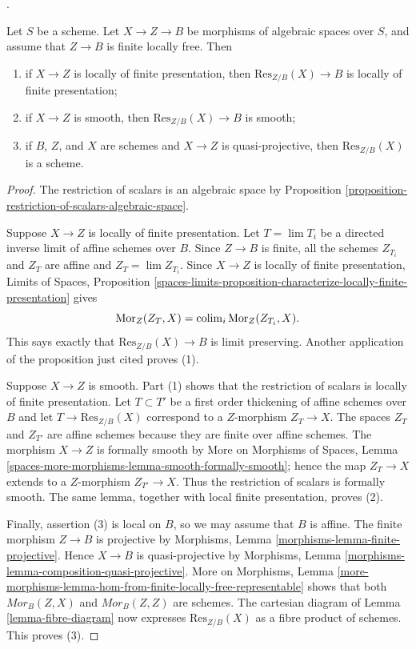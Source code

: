 \begin{proposition}
\label{proposition-restriction-of-scalars-properties}
\begin{reference}
\cite[Expos\'e 221, Proposition 5.7]{FGA}.
\end{reference}
Let $S$ be a scheme. Let $X \to Z \to B$ be morphisms of algebraic spaces
over $S$, and assume that $Z \to B$ is finite locally free. Then
\begin{enumerate}
\item if $X \to Z$ is locally of finite presentation, then
$\text{Res}_{Z/B}(X) \to B$ is locally of finite presentation;
\item if $X \to Z$ is smooth, then
$\text{Res}_{Z/B}(X) \to B$ is smooth;
\item if $B$, $Z$, and $X$ are schemes and $X \to Z$ is quasi-projective,
then $\text{Res}_{Z/B}(X)$ is a scheme.
\end{enumerate}
\end{proposition}

\begin{proof}
The restriction of scalars is an algebraic space by Proposition
\ref{proposition-restriction-of-scalars-algebraic-space}.

Suppose $X \to Z$ is locally of finite presentation. Let
$T = \lim T_i$ be a directed inverse limit of affine schemes over $B$.
Since $Z \to B$ is finite, all the schemes $Z_{T_i}$ and $Z_T$ are affine
and $Z_T = \lim Z_{T_i}$. Since $X \to Z$ is locally of finite
presentation, Limits of Spaces, Proposition
\ref{spaces-limits-proposition-characterize-locally-finite-presentation}
gives
$$
\mathop{\mathrm{Mor}}\nolimits_Z(Z_T, X) = \mathop{\mathrm{colim}}\nolimits_i \mathop{\mathrm{Mor}}\nolimits_Z(Z_{T_i}, X).
$$
This says exactly that $\text{Res}_{Z/B}(X) \to B$ is limit preserving.
Another application of the proposition just cited proves (1).

Suppose $X \to Z$ is smooth. Part (1) shows that the restriction of
scalars is locally of finite presentation. Let $T \subset T'$ be a first
order thickening of affine schemes over $B$ and let
$T \to \text{Res}_{Z/B}(X)$ correspond to a $Z$-morphism
$Z_T \to X$. The spaces $Z_T$ and $Z_{T'}$ are affine schemes because
they are finite over affine schemes. The morphism $X \to Z$ is formally
smooth by More on Morphisms of Spaces, Lemma
\ref{spaces-more-morphisms-lemma-smooth-formally-smooth}; hence the map
$Z_T \to X$ extends to a $Z$-morphism $Z_{T'} \to X$. Thus the restriction
of scalars is formally smooth. The same lemma, together with local finite
presentation, proves (2).

Finally, assertion (3) is local on $B$, so we may assume that $B$ is
affine. The finite morphism $Z \to B$ is projective by Morphisms, Lemma
\ref{morphisms-lemma-finite-projective}. Hence $X \to B$ is
quasi-projective by Morphisms, Lemma
\ref{morphisms-lemma-composition-quasi-projective}. More on Morphisms,
Lemma \ref{more-morphisms-lemma-hom-from-finite-locally-free-representable}
shows that both $\mathit{Mor}_B(Z, X)$ and $\mathit{Mor}_B(Z, Z)$ are
schemes. The cartesian diagram of Lemma \ref{lemma-fibre-diagram} now
expresses $\text{Res}_{Z/B}(X)$ as a fibre product of schemes. This proves
(3).
\end{proof}

